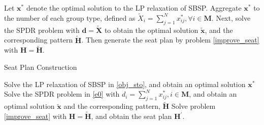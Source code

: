 Let $\mathbf{x}^{*}$ denote the optimal solution to the LP relaxation of SBSP. Aggregate $\mathbf{x}^{*}$ to the number of each group type, defined as $\tilde{X}_{i} =\sum_{j=1}^{N} x^{*}_{ij}, \forall i \in \mathbf{M}$. Next, solve the SPDR problem with $\bm{d} = \bm{\tilde{X}}$ to obtain the optimal solution $\mathbf{\tilde{x}}$, and the corresponding pattern $\tilde{\bm{H}}$. Then generate the seat plan by problem \eqref{improve_seat} with $\bm{H}=  \tilde{\bm{H}}$.


\begin{algorithm}
  \caption{Seat Plan Construction}\label{seat_construction}
    {Solve the LP relaxation of SBSP in \eqref{obj_sto}, and obtain an optimal solution $\mathbf{x}^{*}$\;}
    {Solve the SPDR problem in \eqref{e0} with $d_{i} = \sum_{j=1}^{N} x^{*}_{ij}, i \in \mathbf{M}$, and obtain an optimal solution $\tilde{\mathbf{x}}$ and the corresponding pattern, $\tilde{\bm{H}}$\;}
    {Solve problem \eqref{improve_seat} with $\bm{H} = \tilde{\bm{H}}$, and obtain the seat plan $\bm{H}^{\prime}$.}
\end{algorithm}

